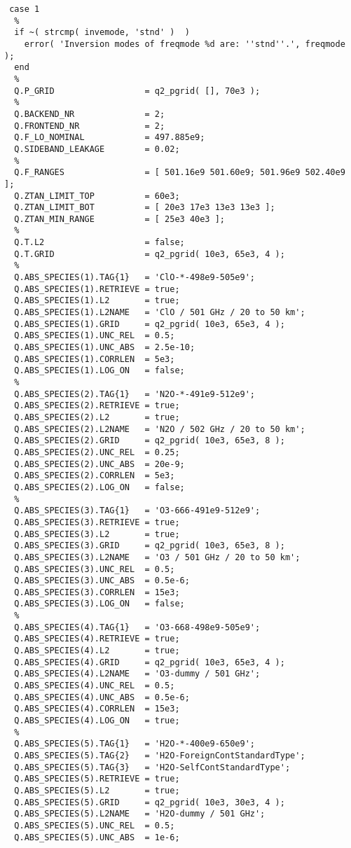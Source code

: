 \begin{verbatim}
 case 1
  %
  if ~( strcmp( invemode, 'stnd' )  )
    error( 'Inversion modes of freqmode %d are: ''stnd''.', freqmode ); 
  end
  %
  Q.P_GRID                  = q2_pgrid( [], 70e3 ); 
  %
  Q.BACKEND_NR              = 2;
  Q.FRONTEND_NR             = 2;
  Q.F_LO_NOMINAL            = 497.885e9;
  Q.SIDEBAND_LEAKAGE        = 0.02;
  %
  Q.F_RANGES                = [ 501.16e9 501.60e9; 501.96e9 502.40e9 ];
  Q.ZTAN_LIMIT_TOP          = 60e3;
  Q.ZTAN_LIMIT_BOT          = [ 20e3 17e3 13e3 13e3 ];
  Q.ZTAN_MIN_RANGE          = [ 25e3 40e3 ];
  %
  Q.T.L2                    = false;
  Q.T.GRID                  = q2_pgrid( 10e3, 65e3, 4 );
  %
  Q.ABS_SPECIES(1).TAG{1}   = 'ClO-*-498e9-505e9';
  Q.ABS_SPECIES(1).RETRIEVE = true;
  Q.ABS_SPECIES(1).L2       = true;
  Q.ABS_SPECIES(1).L2NAME   = 'ClO / 501 GHz / 20 to 50 km';
  Q.ABS_SPECIES(1).GRID     = q2_pgrid( 10e3, 65e3, 4 );
  Q.ABS_SPECIES(1).UNC_REL  = 0.5;
  Q.ABS_SPECIES(1).UNC_ABS  = 2.5e-10;
  Q.ABS_SPECIES(1).CORRLEN  = 5e3;
  Q.ABS_SPECIES(1).LOG_ON   = false;
  %
  Q.ABS_SPECIES(2).TAG{1}   = 'N2O-*-491e9-512e9';
  Q.ABS_SPECIES(2).RETRIEVE = true;
  Q.ABS_SPECIES(2).L2       = true;
  Q.ABS_SPECIES(2).L2NAME   = 'N2O / 502 GHz / 20 to 50 km';
  Q.ABS_SPECIES(2).GRID     = q2_pgrid( 10e3, 65e3, 8 );
  Q.ABS_SPECIES(2).UNC_REL  = 0.25;
  Q.ABS_SPECIES(2).UNC_ABS  = 20e-9;
  Q.ABS_SPECIES(2).CORRLEN  = 5e3;
  Q.ABS_SPECIES(2).LOG_ON   = false;
  %
  Q.ABS_SPECIES(3).TAG{1}   = 'O3-666-491e9-512e9';
  Q.ABS_SPECIES(3).RETRIEVE = true;
  Q.ABS_SPECIES(3).L2       = true;
  Q.ABS_SPECIES(3).GRID     = q2_pgrid( 10e3, 65e3, 8 );
  Q.ABS_SPECIES(3).L2NAME   = 'O3 / 501 GHz / 20 to 50 km';
  Q.ABS_SPECIES(3).UNC_REL  = 0.5;
  Q.ABS_SPECIES(3).UNC_ABS  = 0.5e-6;
  Q.ABS_SPECIES(3).CORRLEN  = 15e3;
  Q.ABS_SPECIES(3).LOG_ON   = false;
  %
  Q.ABS_SPECIES(4).TAG{1}   = 'O3-668-498e9-505e9';
  Q.ABS_SPECIES(4).RETRIEVE = true;
  Q.ABS_SPECIES(4).L2       = true;
  Q.ABS_SPECIES(4).GRID     = q2_pgrid( 10e3, 65e3, 4 );
  Q.ABS_SPECIES(4).L2NAME   = 'O3-dummy / 501 GHz';
  Q.ABS_SPECIES(4).UNC_REL  = 0.5;
  Q.ABS_SPECIES(4).UNC_ABS  = 0.5e-6;
  Q.ABS_SPECIES(4).CORRLEN  = 15e3;
  Q.ABS_SPECIES(4).LOG_ON   = true;
  %
  Q.ABS_SPECIES(5).TAG{1}   = 'H2O-*-400e9-650e9';
  Q.ABS_SPECIES(5).TAG{2}   = 'H2O-ForeignContStandardType';
  Q.ABS_SPECIES(5).TAG{3}   = 'H2O-SelfContStandardType';
  Q.ABS_SPECIES(5).RETRIEVE = true;
  Q.ABS_SPECIES(5).L2       = true;
  Q.ABS_SPECIES(5).GRID     = q2_pgrid( 10e3, 30e3, 4 );
  Q.ABS_SPECIES(5).L2NAME   = 'H2O-dummy / 501 GHz';
  Q.ABS_SPECIES(5).UNC_REL  = 0.5;
  Q.ABS_SPECIES(5).UNC_ABS  = 1e-6;

\end{verbatim}
